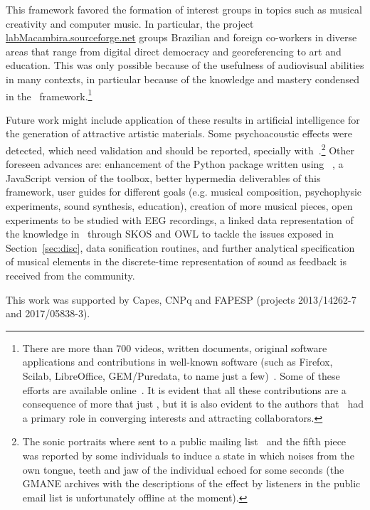 This framework favored the formation of interest groups in topics such as musical creativity and computer music.
In particular, the project \url{labMacambira.sourceforge.net} groups Brazilian and foreign co-workers
in diverse areas that range from digital direct democracy and georeferencing to art and education.
This was only possible because of the usefulness of audiovisual abilities in many contexts, in particular because of the knowledge and mastery condensed in the \massa\ framework.\footnote{There are more than 700 videos, written documents,
 original software applications and contributions in well-known software (such as Firefox, Scilab, LibreOffice, GEM/Puredata, to name just a few)~\cite{siteLM,wikiLM,vimeoLM}.
Some of these efforts are available online~\cite{dissertacao}.
It is evident that all these contributions are a consequence of more that just \massa, but it is also evident to the authors that \massa\ had a primary role in converging interests and attracting collaborators.}

Future work might include application of these results in artificial intelligence
for the generation of attractive artistic materials. Some psychoacoustic effects were detected,
which need validation and should be reported, specially with~\cite{quadrosSonoros}.\footnote{The sonic portraits where sent to a public mailing list~\cite{metaLista} and the fifth piece was reported by some individuals to induce a state in which noises from the own tongue, teeth and jaw of the individual echoed for some seconds (the GMANE archives with the descriptions of the effect by listeners in the public email list is unfortunately offline at the moment).} Other foreseen advances
are: enhancement of the Python package written using \massa~\cite{music}, a JavaScript version of the toolbox, better hypermedia deliverables of this framework, user guides
for different goals (e.g. musical composition, psychophysic experiments, sound synthesis, education), creation
of more musical pieces, open experiments to be studied with EEG recordings, a linked data representation
of the knowledge in \massa\ through SKOS and OWL to tackle the issues exposed in Section~\ref{sec:disc},
data sonification routines, and further analytical specification of musical
elements in the discrete-time representation of sound as feedback is received from the community.

\begin{acks}
    This work was supported by Capes, CNPq and FAPESP (projects 2013/14262-7 and 2017/05838-3).
\end{acks}


% 

